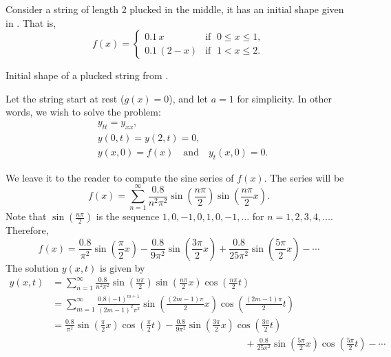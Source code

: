 \begin{example} \label{example:pluckedstring}
Consider a string of length 2 plucked in the middle,
it has an initial shape given in .
That is,
\begin{equation*}
f(x) = \begin{cases}
0.1\, x & \text{if } \; 0 \leq x \leq 1 , \\
0.1\, (2-x) & \text{if } \; 1 < x \leq 2 .
\end{cases}
\end{equation*}

\begin{myfig}
\capstart
{}
\caption{Initial shape of a plucked string from
.\label{wave:pluckedstrfig}}
\end{myfig}

Let the string start at rest ($g(x) =
0$), and let $a=1$ for simplicity.  In other words, we wish to
solve the problem:
\begin{align*}
& y_{tt} = y_{xx}, \\
& y(0,t) = y(2,t)= 0 , \\
& y(x,0) = f(x) \quad \text{and} \quad y_t(x,0)= 0 .
\end{align*}

We leave it to the reader to compute the sine series of $f(x)$.  The series
will be
\begin{equation*}
f(x) = \sum_{n=1}^\infty
\frac{0.8}{n^2 \pi^2}
\sin \left( \frac{n \pi}{2} \right)
\sin \left( \frac{n \pi}{2} x \right) .
\end{equation*}
Note that 
$\sin \left( \frac{n \pi}{2} \right)$
is the sequence $1, 0, -1, 0, 1, 0, -1, \ldots$
for $n = 1,2,3,4,\ldots$.  Therefore,
\begin{equation*}
f(x) = 
\frac{0.8}{\pi^2}
\sin \left( \frac{\pi}{2} x \right)
-
\frac{0.8}{9 \pi^2}
\sin \left( \frac{3 \pi}{2} x \right)
+
\frac{0.8}{25 \pi^2}
\sin \left( \frac{5 \pi}{2} x \right)
- \cdots
\end{equation*}
The solution $y(x,t)$ is given by
\begin{equation*}
\begin{split}
y(x,t) & = 
\sum_{n=1}^\infty
\frac{0.8}{n^2 \pi^2}
\sin \left( \frac{n \pi}{2} \right)
\sin \left( \frac{n \pi}{2} x \right)
\cos \left( \frac{n \pi}{2} t \right)
\\
& = 
\sum_{m=1}^\infty
\frac{0.8 {(-1)}^{m+1}}{{(2m-1)}^2 \pi^2}
\sin \left( \frac{(2m-1) \pi}{2} x \right)
\cos \left( \frac{(2m-1) \pi}{2} t \right)
\\
& =
\frac{0.8}{\pi^2} 
\sin \left( \frac{\pi}{2}  x \right)
\cos \left( \frac{\pi}{2}  t \right)
-
\frac{0.8}{9 \pi^2} 
\sin \left( \frac{3 \pi}{2}  x \right)
\cos \left( \frac{3 \pi}{2}  t \right)
\\
& \hspace{20em}
+
\frac{0.8}{25 \pi^2}
\sin \left( \frac{5 \pi}{2}  x \right)
\cos \left( \frac{5 \pi}{2}  t \right) 
- \cdots
\end{split}
\end{equation*}


\end{example}
